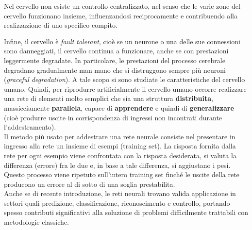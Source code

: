 Nel cervello non esiste un controllo centralizzato, nel senso che le varie zone del cervello funzionano insieme, influenzandosi reciprocamente e contribuendo alla realizzazione di uno specifico compito.

\newpage

Infine, il cervello è \emph{fault tolerant}, cioè se un neurone o una delle sue connessioni sono danneggiati, il cervello continua a funzionare, anche se con prestazioni leggermente degradate. In particolare, le prestazioni del processo cerebrale degradano gradualmente man mano che si distruggono sempre più neuroni (\emph{graceful degradation}).
A tale scopo si sono studiate le caratteristiche del cervello umano.
Quindi, per riprodurre artificialmente il cervello umano occorre realizzare una rete di elementi molto semplici che sia una struttura \textbf{distribuita}, massicciamente \textbf{parallela}, capace di \textbf{apprendere} e quindi di \textbf{generalizzare} (cioè produrre uscite in corrispondenza di ingressi non incontrati durante l’addestramento).\\

Il metodo più usato per addestrare una rete neurale consiste nel presentare in ingresso alla rete un insieme di esempi (training set). La risposta fornita dalla rete per ogni esempio viene confrontata con la risposta desiderata, si valuta la differenza (errore) fra le due e, in base a tale differenza, si aggiustano i pesi. Questo processo viene ripetuto sull’intero training set finché le uscite della rete producono un errore al di sotto di una soglia prestabilita.\\

Anche se di recente introduzione, le reti neurali trovano valida applicazione in settori quali predizione, classificazione, riconoscimento e controllo, portando spesso contributi significativi alla soluzione di problemi difficilmente trattabili con metodologie classiche.

\newpage

